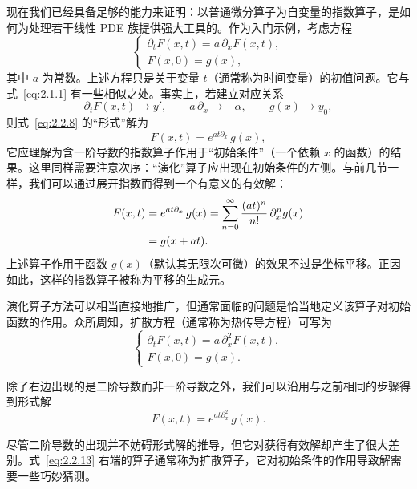 现在我们已经具备足够的能力来证明：以普通微分算子为自变量的指数算子，是如何为处理若干线性 PDE 族提供强大工具的。作为入门示例，考虑方程
\begin{equation}
\begin{cases}
\partial_{t}F(x,t)=a\,\partial_{x}F(x,t),\\[1mm]
F(x,0)=g(x),
\end{cases}
\label{eq:2.2.8}
\end{equation}
其中 $a$ 为常数。上述方程只是关于变量 $t$（通常称为时间变量）的初值问题。它与式~\eqref{eq:2.1.1} 有一些相似之处。事实上，若建立对应关系
\begin{equation}
\partial_{t}F(x,t)\rightarrow y',\qquad
a\,\partial_{x}\rightarrow -\alpha,\qquad
g(x)\rightarrow y_{0},
\label{eq:2.2.9}
\end{equation}
则式~\eqref{eq:2.2.8} 的``形式''解为
\begin{equation}
F(x,t)=e^{a t\partial_{x}}\,g(x),
\label{eq:2.2.10}
\end{equation}
它应理解为含一阶导数的指数算子作用于``初始条件''（一个依赖 $x$ 的函数）的结果。这里同样需要注意次序：``演化''算子应出现在初始条件的左侧。与前几节一样，我们可以通过展开指数而得到一个有意义的有效解：
\begin{align}
F(x,t)&=e^{a t\partial_{x}}\,g(x)
=\sum_{n=0}^{\infty}\frac{(a t)^{n}}{n!}\,\partial_{x}^{n}g(x)\notag\\
&=g(x+at).
\label{eq:2.2.11}
\end{align}
上述算子作用于函数 $g(x)$（默认其无限次可微）的效果不过是坐标平移。正因如此，这样的指数算子被称为平移的生成元。

演化算子方法可以相当直接地推广，但通常面临的问题是恰当地定义该算子对初始函数的作用。众所周知，扩散方程（通常称为热传导方程）可写为
\begin{equation}
\begin{cases}
\partial_{t}F(x,t)=a\,\partial_{x}^{2}F(x,t),\\[1mm]
F(x,0)=g(x).
\end{cases}
\label{eq:2.2.12}
\end{equation}

除了右边出现的是二阶导数而非一阶导数之外，我们可以沿用与之前相同的步骤得到形式解
\begin{equation}
F(x,t)=e^{a t\partial_{x}^{2}}\,g(x).
\label{eq:2.2.13}
\end{equation}

尽管二阶导数的出现并不妨碍形式解的推导，但它对获得有效解却产生了很大差别。式~\eqref{eq:2.2.13} 右端的算子通常称为扩散算子，它对初始条件的作用导致解需要一些巧妙猜测。

